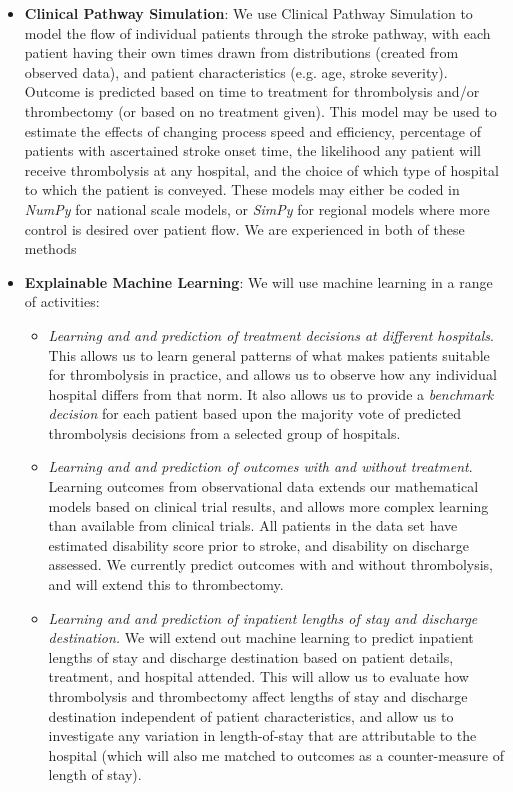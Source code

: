 \begin{itemize}

    \item \textbf{Clinical Pathway Simulation}: We use Clinical Pathway Simulation to model the flow of individual patients through the stroke pathway, with each patient having their own times drawn from distributions (created from observed data), and patient characteristics (e.g. age, stroke severity). Outcome is predicted based on time to treatment for thrombolysis and/or thrombectomy (or based on no treatment given). This model may be used to estimate the effects of changing process speed and efficiency, percentage of patients with ascertained stroke onset time, the likelihood any patient will receive thrombolysis at any hospital, and the choice of which type of hospital to which the patient is conveyed. These models may either be coded in \textit{NumPy} for national scale models, or \textit{SimPy} for regional models where more control is desired over patient flow. We are experienced in both of these methods \cite{allen_use_2022, allen_simulation_2020}

    \item \textbf{Explainable Machine Learning}: We will use machine learning in a range of activities:

    \begin{itemize}
        \item \textit{Learning and and prediction of treatment decisions at different hospitals}. This allows us to learn general patterns of what makes patients suitable for thrombolysis in practice, and allows us to observe how any individual hospital differs from that norm. It also allows us to provide a \textit{benchmark decision} for each patient based upon the majority vote of predicted thrombolysis decisions from a selected group of hospitals. 

        \item \textit{Learning and and prediction of outcomes with and without treatment}. Learning outcomes from observational data extends our mathematical models based on clinical trial results, and allows more complex learning than available from clinical trials. All patients in the data set have estimated disability score prior to stroke, and disability on discharge assessed. We currently predict outcomes with and without thrombolysis, and will extend this to thrombectomy.

        \item \textit{Learning and and prediction of inpatient lengths of stay and discharge destination.} We will extend out machine learning to predict inpatient lengths of stay and discharge destination based on patient details, treatment, and hospital attended. This will allow us to evaluate how thrombolysis and thrombectomy affect lengths of stay and discharge destination independent of patient characteristics, and allow us to investigate any variation in length-of-stay that are attributable to the hospital (which will also me matched to outcomes as a counter-measure of length of stay).
        

\end{itemize}
\end{itemize}
